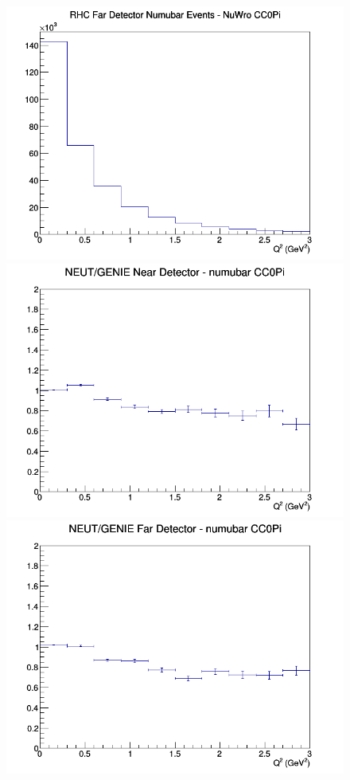 \begin{figure}[h]
\endminipage
{}
\includegraphics[width=\linewidth]{eff_Q2/FGT/CC0Pi_RHC_FD_numubar_Q2_NuWro.png}
\endminipage
\newline
{}
\includegraphics[width=\linewidth]{eff_Q2/FGT/ratios/CC0Pi_NEUT_GENIE_numubar_near_Q2.png}
\endminipage
{}
\includegraphics[width=\linewidth]{eff_Q2/FGT/ratios/CC0Pi_NEUT_GENIE_numubar_far_Q2.png}

\end{figure}
